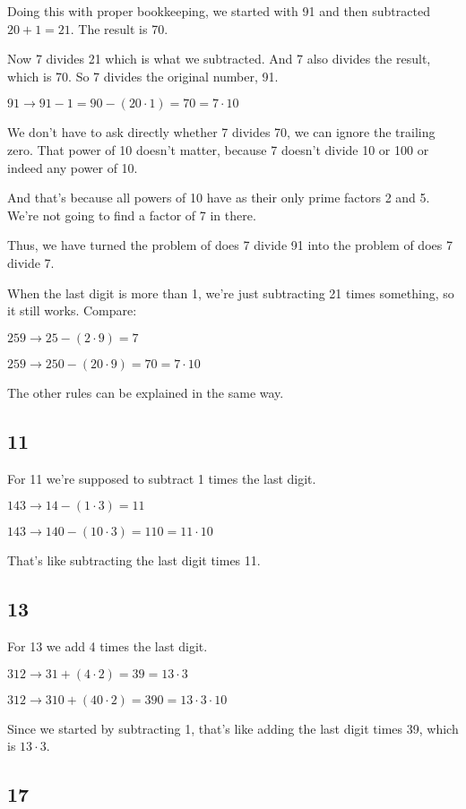 \documentclass[11pt, oneside]{article}
\begin{document}
Doing this with proper bookkeeping, we started with 91 and then subtracted $20 + 1 = 21$.  The result is 70.

Now 7 divides 21 which is what we subtracted.  And 7 also divides the result, which is 70.  So 7 divides the original number, 91.

$91 \rightarrow 91 - 1 = 90 - (20 \cdot 1) = 70 = 7 \cdot 10$

We don't have to ask directly whether 7 divides 70, we can ignore the trailing zero.  That power of 10 doesn't matter, because 7 doesn't divide 10 or 100 or indeed any power of 10.  

And that's because all powers of 10 have as their only prime factors 2 and 5.  We're not going to find a factor of 7 in there.

Thus, we have turned the problem of does 7 divide 91 into the problem of does 7 divide 7.  

When the last digit is more than 1, we're just subtracting 21 times something, so it still works.  Compare:

$259 \rightarrow 25 - (2 \cdot 9) = 7$

$259 \rightarrow 250 - (20 \cdot 9) = 70 = 7 \cdot 10$

The other rules can be explained in the same way.  

\subsection*{11}

For 11 we're supposed to subtract 1 times the last digit.

$143 \rightarrow 14 - (1 \cdot 3) = 11$

$143 \rightarrow 140 - (10 \cdot 3) = 110 = 11 \cdot 10$

That's like subtracting the last digit times 11.

\subsection*{13}

For 13 we add 4 times the last digit.

$312 \rightarrow 31 + (4 \cdot 2) = 39 = 13 \cdot 3$

$312 \rightarrow 310 + (40 \cdot 2) = 390 = 13 \cdot 3 \cdot 10$

Since we started by subtracting 1, that's like adding the last digit times 39, which is $13 \cdot 3$.

\subsection*{17}
\end{document}
